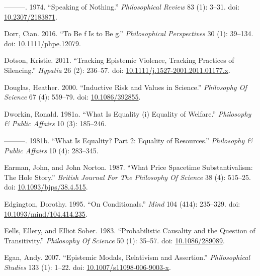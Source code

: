 \documentclass[
  10pt,
  letterpaper,
  DIV=11,
  numbers=noendperiod,
  twoside]{scrartcl}
\newlength{\cslhangindent}
\newenvironment{CSLReferences}[2] %
 {\begin{list}{}{%
  \setlength{\itemindent}{0pt}
  \setlength{\leftmargin}{0pt}
  \setlength{\parsep}{0pt}
  \ifodd #1
   \setlength{\leftmargin}{\cslhangindent}
   \setlength{\itemindent}{-1\cslhangindent}
  \fi
  \setlength{\itemsep}{#2\baselineskip}}}
 {\end{list}}
\begin{document}
\begin{CSLReferences}{1}{0}
---------. 1974. {``Speaking of Nothing.''} \emph{Philosophical Review}
83 (1): 3--31. doi:
\href{https://doi.org/10.2307/2183871}{10.2307/2183871}.

Dorr, Cian. 2016. {``To Be f Is to Be g.''} \emph{Philosophical
Perspectives} 30 (1): 39--134. doi:
\href{https://doi.org/10.1111/phpe.12079}{10.1111/phpe.12079}.

Dotson, Kristie. 2011. {``Tracking Epistemic Violence, Tracking
Practices of Silencing.''} \emph{Hypatia} 26 (2): 236--57. doi:
\href{https://doi.org/10.1111/j.1527-2001.2011.01177.x}{10.1111/j.1527-2001.2011.01177.x}.

Douglas, Heather. 2000. {``Inductive Risk and Values in Science.''}
\emph{Philosophy Of Science} 67 (4): 559--79. doi:
\href{https://doi.org/10.1086/392855}{10.1086/392855}.

Dworkin, Ronald. 1981a. {``What Is Equality (i) Equality of Welfare.''}
\emph{Philosophy \& Public Affairs} 10 (3): 185--246.

---------. 1981b. {``What Is Equality? Part 2: Equality of Resources.''}
\emph{Philosophy \& Public Affairs} 10 (4): 283--345.

Earman, John, and John Norton. 1987. {``What Price Spacetime
Substantivalism: The Hole Story.''} \emph{British Journal For The
Philosophy Of Science} 38 (4): 515--25. doi:
\href{https://doi.org/10.1093/bjps/38.4.515}{10.1093/bjps/38.4.515}.

Edgington, Dorothy. 1995. {``On Conditionals.''} \emph{Mind} 104 (414):
235--329. doi:
\href{https://doi.org/10.1093/mind/104.414.235}{10.1093/mind/104.414.235}.

Eells, Ellery, and Elliot Sober. 1983. {``Probabilistic Causality and
the Question of Transitivity.''} \emph{Philosophy Of Science} 50 (1):
35--57. doi: \href{https://doi.org/10.1086/289089}{10.1086/289089}.

Egan, Andy. 2007. {``Epistemic Modals, Relativism and Assertion.''}
\emph{Philosophical Studies} 133 (1): 1--22. doi:
\href{https://doi.org/10.1007/s11098-006-9003-x}{10.1007/s11098-006-9003-x}.


\end{CSLReferences}
\end{document}

